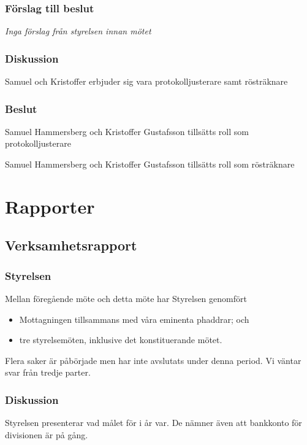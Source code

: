 \documentclass[protokoll]{dvd}
\begin{document}
\subsubsection*{Förslag till beslut}

\emph{Inga förslag från styrelsen innan mötet}

\subsubsection{Diskussion}
Samuel och Kristoffer erbjuder sig vara protokolljusterare samt rösträknare

\subsubsection{Beslut}
\begin{attsatser}
	\item Samuel Hammersberg och Kristoffer Gustafsson tillsätts roll som protokolljusterare
	\item Samuel Hammersberg och Kristoffer Gustafsson tillsätts roll som rösträknare
\end{attsatser}


\newpage
\section{Rapporter}

\subsection{Verksamhetsrapport}

\subsubsection{Styrelsen}

Mellan föregående möte och detta möte har Styrelsen genomfört

\begin{itemize}
	\item Mottagningen tillsammans med våra eminenta phaddrar; och
	\item tre styrelsemöten, inklusive det konstituerande mötet.
\end{itemize}

Flera saker är påbörjade men har inte avslutats under denna period.
Vi väntar svar från tredje parter.

\subsubsection{Diskussion}
Styrelsen presenterar vad målet för i år var. De nämner även att bankkonto för divisionen är på gång. 
\end{document}
